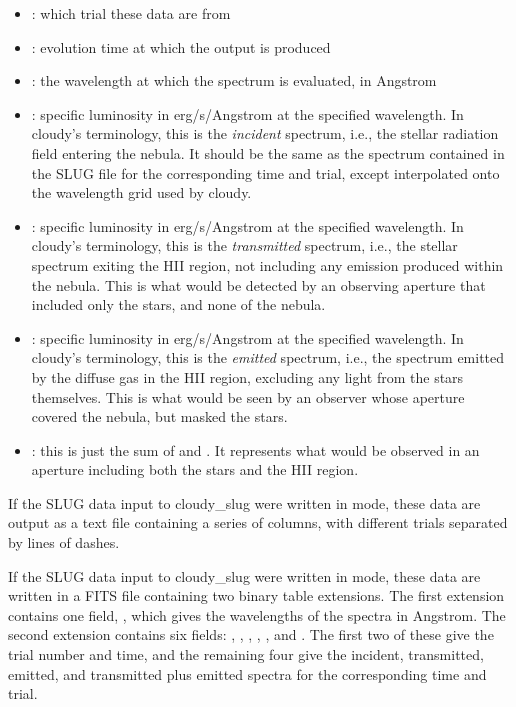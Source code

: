 \documentclass[letterpaper,10pt,english]{sphinxmanual}
\begin{document}
\begin{itemize}
\item {} 
: which trial these data are from

\item {} 
: evolution time at which the output is produced

\item {} 
: the wavelength at which the spectrum is evaluated,
in Angstrom

\item {} 
: specific luminosity in erg/s/Angstrom at the specified
wavelength. In cloudy's terminology, this is the \emph{incident}
spectrum, i.e., the stellar radiation field entering the nebula. It
should be the same as the spectrum contained in the SLUG
 file for the corresponding time and trial,
except interpolated onto the wavelength grid used by cloudy.

\item {} 
:  specific luminosity in erg/s/Angstrom at the specified
wavelength. In cloudy's terminology, this is the \emph{transmitted}
spectrum, i.e., the stellar spectrum exiting the HII region, not
including any emission produced within the nebula. This is what
would be detected by an observing aperture that included only the
stars, and none of the nebula.

\item {} 
:  specific luminosity in erg/s/Angstrom at the specified
wavelength. In cloudy's terminology, this is the \emph{emitted}
spectrum, i.e., the spectrum emitted by the diffuse gas in the HII
region, excluding any light from the stars themselves. This is what
would be seen by an observer whose aperture covered the nebula, but
masked the stars.

\item {} 
: this is just the sum of
 and . It represents what would be
observed in an aperture including both the stars and the HII
region.

\end{itemize}

If the SLUG data input to cloudy\_slug were written in  mode,
these data are output as a text file containing a series of columns,
with different trials separated by lines of dashes.

If the SLUG data input to cloudy\_slug were written in  mode,
these data are written in a FITS file containing two binary table
extensions. The first extension contains one field, ,
which gives the wavelengths of the spectra in Angstrom. The second
extension contains six fields: , ,
, , ,
and . The first two of these give
the trial number and time, and the remaining four give the incident,
transmitted, emitted, and transmitted plus emitted spectra for the
corresponding time and trial.
\end{document}
